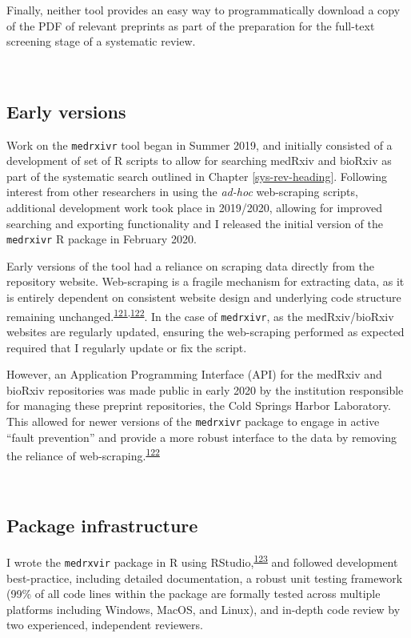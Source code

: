 \documentclass[a4paper, twoside]{templates/ociamthesis}
\begin{document}
Finally, neither tool provides an easy way to programmatically download a copy of the PDF of relevant preprints as part of the preparation for the full-text screening stage of a systematic review.

~

\hypertarget{early-versions}{%
\subsection{Early versions}\label{early-versions}}

Work on the \texttt{medrxivr} tool began in Summer 2019, and initially consisted of a development of set of R scripts to allow for searching medRxiv and bioRxiv as part of the systematic search outlined in Chapter \ref{sys-rev-heading}. Following interest from other researchers in using the \emph{ad-hoc} web-scraping scripts, additional development work took place in 2019/2020, allowing for improved searching and exporting functionality and I released the initial version of the \texttt{medrxivr} R package in February 2020.

Early versions of the tool had a reliance on scraping data directly from the repository website. Web-scraping is a fragile mechanism for extracting data, as it is entirely dependent on consistent website design and underlying code structure remaining unchanged.\textsuperscript{\protect\hyperlink{ref-shaw2002}{121},\protect\hyperlink{ref-laprie1992}{122}}. In the case of \texttt{medrxivr}, as the medRxiv/bioRxiv websites are regularly updated, ensuring the web-scraping performed as expected required that I regularly update or fix the script.

However, an Application Programming Interface (API) for the medRxiv and bioRxiv repositories was made public in early 2020 by the institution responsible for managing these preprint repositories, the Cold Springs Harbor Laboratory. This allowed for newer versions of the \texttt{medrxivr} package to engage in active ``fault prevention'' and provide a more robust interface to the data by removing the reliance of web-scraping.\textsuperscript{\protect\hyperlink{ref-laprie1992}{122}}

~

\hypertarget{package-infrastructure}{%
\subsection{Package infrastructure}\label{package-infrastructure}}

I wrote the \texttt{medrxvir} package in R using RStudio,\textsuperscript{\protect\hyperlink{ref-rcoreteam2019}{123}} and followed development best-practice, including detailed documentation, a robust unit testing framework (99\% of all code lines within the package are formally tested across multiple platforms including Windows, MacOS, and Linux), and in-depth code review by two experienced, independent reviewers.
\end{document}
